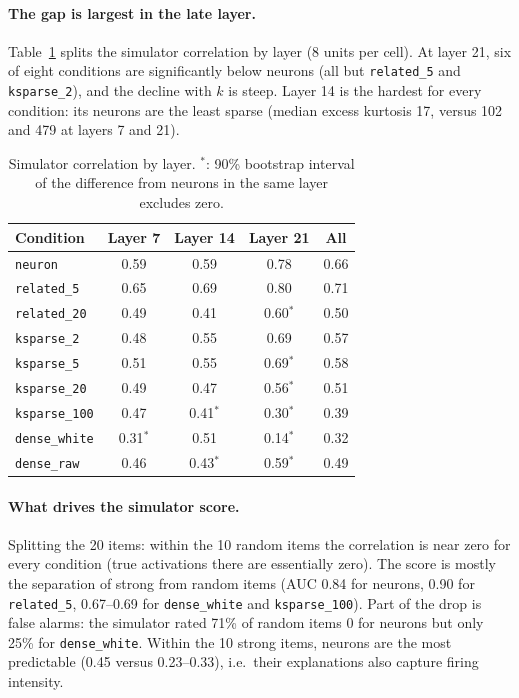 \documentclass[11pt]{article}
\begin{document}
\paragraph{The gap is largest in the late layer.} Table~\ref{tab:layers} splits the simulator correlation by layer
(8 units per cell). At layer 21, six of eight conditions are significantly below neurons (all but \texttt{related\_5}
and \texttt{ksparse\_2}), and the decline with $k$ is steep. Layer 14 is the hardest for every condition: its neurons are the least sparse (median excess kurtosis 17,
versus 102 and 479 at layers 7 and 21).

\begin{table}[h]
\centering\small
\begin{tabular}{lcccc}
\toprule
Condition & Layer 7 & Layer 14 & Layer 21 & All \\
\midrule
\texttt{neuron}       & 0.59 & 0.59 & 0.78 & 0.66 \\
\texttt{related\_5}   & 0.65 & 0.69 & 0.80 & 0.71 \\
\texttt{related\_20}  & 0.49 & 0.41 & 0.60$^*$ & 0.50 \\
\texttt{ksparse\_2}   & 0.48 & 0.55 & 0.69 & 0.57 \\
\texttt{ksparse\_5}   & 0.51 & 0.55 & 0.69$^*$ & 0.58 \\
\texttt{ksparse\_20}  & 0.49 & 0.47 & 0.56$^*$ & 0.51 \\
\texttt{ksparse\_100} & 0.47 & 0.41$^*$ & 0.30$^*$ & 0.39 \\
\texttt{dense\_white} & 0.31$^*$ & 0.51 & 0.14$^*$ & 0.32 \\
\texttt{dense\_raw}   & 0.46 & 0.43$^*$ & 0.59$^*$ & 0.49 \\
\bottomrule
\end{tabular}
\caption{Simulator correlation by layer. $^*$: 90\% bootstrap interval of the difference from neurons in the same
layer excludes zero.}
\label{tab:layers}
\end{table}

\paragraph{What drives the simulator score.} Splitting the 20 items: within the 10 random items the correlation is
near zero for every condition (true activations there are essentially zero). The score is mostly the separation of
strong from random items (AUC 0.84 for neurons, 0.90 for \texttt{related\_5}, 0.67--0.69 for \texttt{dense\_white} and
\texttt{ksparse\_100}). Part of the drop is false alarms: the simulator rated 71\% of random items 0 for neurons but only
25\% for \texttt{dense\_white}. Within the 10 strong items, neurons are the most predictable (0.45 versus 0.23--0.33),
i.e.\ their explanations also capture firing intensity.
\end{document}
